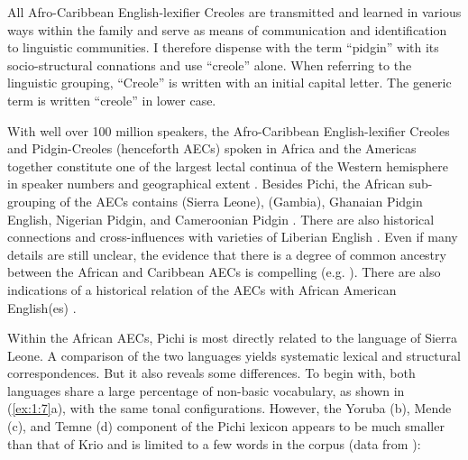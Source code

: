 All Afro-Caribbean English-lexifier Creoles are transmitted and learned in various ways within the family and serve as means of communication and identification to linguistic communities. I therefore dispense with the term “pidgin” with its socio-structural connations and use “creole” alone. When referring to the linguistic grouping, “Creole” is written with an initial capital letter. The generic term is written “creole” in lower case. 

With well over 100 million speakers, the Afro-Caribbean English-lexifier Creoles and Pidgin-Creoles (henceforth AECs) spoken in Africa and the Americas together constitute one of the largest lectal continua of the Western hemisphere in speaker numbers and geographical extent \citep[22–23]{Yakpo2016estatuto}. Besides Pichi, the African sub-grouping of the AECs contains  (Sierra Leone),  (Gambia), Ghanaian Pidgin English, Nigerian Pidgin, and Cameroonian Pidgin \citep{HuberGörlach1996,Huber1999,BakerHuber2001}. There are also historical connections and cross-influences with varieties of Liberian English \citep{Singler1997}. Even if many details are still unclear, the evidence that there is a degree of common ancestry between the African and Caribbean AECs is compelling (e.g. \citealt{Hancock1986,Hancock1987,Smith1987,Smith2015}). There are also indications of a historical relation of the AECs with African American English(es) \citep{Dillard1973,Rickford1999,Winford2017}.

Within the African AECs, Pichi is most directly related to the  language of Sierra Leone. A comparison of the two languages yields systematic lexical and structural correspondences. But it also reveals some differences. To begin with, both languages share a large percentage of non-basic vocabulary, as shown in (\ref{ex:1:7}a), with the same tonal configurations. However, the Yoruba (b), Mende (c), and Temne (d) component of the Pichi lexicon appears to be much smaller than that of Krio and is limited to a few words in the corpus (data from \citealt{FyleJones1980}):

